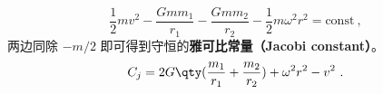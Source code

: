 
\begin{issues}
\issueDraft
\end{issues}


\begin{equation}\label{JacCon_eq1}
\frac{1}{2}mv^2 - \frac{Gmm_1}{r_1} - \frac{Gmm_2}{r_2} - \frac{1}{2}m\omega^2 r^2 = \text{const}~,
\end{equation}
两边同除 $-m/2$ 即可得到守恒的\textbf{雅可比常量（Jacobi constant）}。
\begin{equation}
C_j = 2G\qty(\frac{m_1}{r_1} + \frac{m_2}{r_2}) + \omega^2 r^2 - v^2~.
\end{equation}
